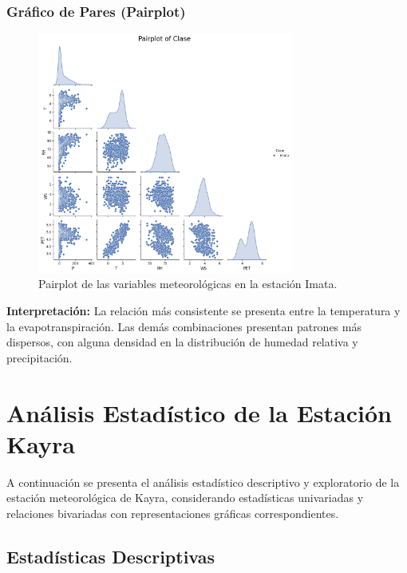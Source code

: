 \subsubsection*{Gráfico de Pares (Pairplot)}
\begin{figure}[htbp]
\centering
\includegraphics[width=0.75\textwidth]{resultados/por_estacion_meteorologica/Imata/pairplot.png}
\caption{Pairplot de las variables meteorológicas en la estación Imata.}
\label{fig:imata_pairplot}
\end{figure}
\textbf{Interpretación:} La relación más consistente se presenta entre la temperatura y la evapotranspiración. Las demás combinaciones presentan patrones más dispersos, con alguna densidad en la distribución de humedad relativa y precipitación.


\section{Análisis Estadístico de la Estación Kayra}

A continuación se presenta el análisis estadístico descriptivo y exploratorio de la estación meteorológica de Kayra, considerando estadísticas univariadas y relaciones bivariadas con representaciones gráficas correspondientes.

\subsection{Estadísticas Descriptivas}

